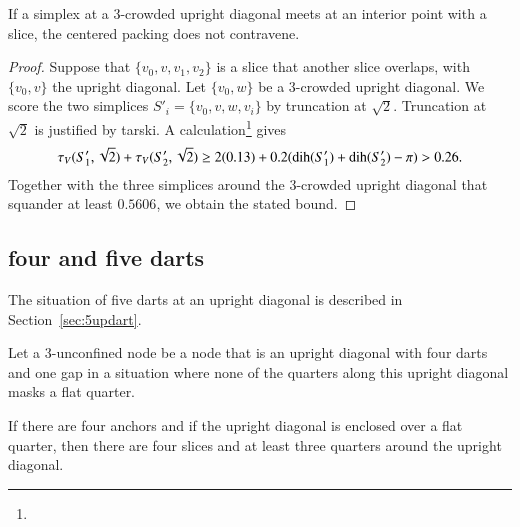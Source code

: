 \begin{lemma}
If a simplex at a $3$-crowded upright diagonal meets at an
interior point with a slice, the centered packing does
not contravene.
\end{lemma}

\begin{proof}
Suppose that $\{v_0,v,v_1,v_2\}$ is a slice that another
slice overlaps, with $\{v_0,v\}$ the upright diagonal.  Let
$\{v_0,w\}$ be a $3$-crowded upright diagonal. We score the two
simplices $S'_i = \{v_0,v,w,v_i\}$ by truncation at $\sqrt{2}$.
Truncation at $\sqrt{2}$ is justified by tarski.
A calculation\footnote{} %
gives
    $$\tau_V(S'_1,\sqrt{2})+\tau_V(S'_2,\sqrt{2})\ge 2(0.13) +
        0.2(\operatorname{dih}(S'_1)+\operatorname{dih}(S'_2)-\pi) > 0.26.
    $$
Together with the three simplices around the $3$-crowded upright
diagonal that squander at least $0.5606$, we obtain the stated
bound.
\end{proof}



\subsection{four and five darts} %
    \label{sec:five-anchors}



\begin{remark}\label{rem:5dart}
The situation of five darts at an upright diagonal is
described in Section~\ref{sec:5updart}.
\end{remark}

\begin{definition}
Let a $3$-unconfined node be a node that is an upright diagonal 
with four darts and one gap in a situation where none of
the quarters along this upright diagonal masks a flat quarter.
\end{definition}

\begin{lemma}
If there are four anchors and if the upright diagonal is enclosed over a
flat quarter, then there are four slices and at least three
quarters around the upright diagonal.
\end{lemma}

